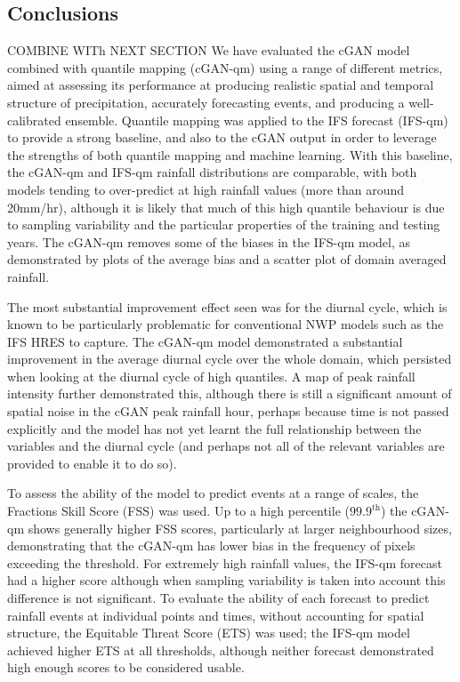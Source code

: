 \documentclass{article}
\begin{document}

\subsection{Conclusions}

COMBINE WITh NEXT SECTION
We have evaluated the cGAN model combined with quantile mapping (cGAN-qm) using a range of different metrics, aimed at assessing its performance at producing realistic spatial and temporal structure of precipitation, accurately forecasting events, and producing a well-calibrated ensemble. 
Quantile mapping was applied to the IFS forecast (IFS-qm) to provide a strong baseline, and also to the cGAN output in order to leverage the strengths of both quantile mapping and machine learning. With this baseline, the cGAN-qm and IFS-qm rainfall distributions are comparable, with both models tending to over-predict at high rainfall values (more than around 20mm/hr), although it is likely that much of this high quantile behaviour is due to sampling variability and the particular properties of the training and testing years. The cGAN-qm removes some of the biases in the IFS-qm model, as demonstrated by plots of the average bias and a scatter plot of domain averaged rainfall.

The most substantial improvement effect seen was for the diurnal cycle, which is known to be particularly problematic for conventional NWP models such as the IFS HRES to capture. The cGAN-qm model demonstrated a substantial improvement in the average diurnal cycle over the whole domain, which persisted when looking at the diurnal cycle of high quantiles. A map of peak rainfall intensity further demonstrated this, although there is still a significant amount of spatial noise in the cGAN peak rainfall hour, perhaps because time is not passed explicitly and the model has not yet learnt the full relationship between the variables and the diurnal cycle (and perhaps not all of the relevant variables are provided to enable it to do so).

To assess the ability of the model to predict events at a range of scales, the Fractions Skill Score (FSS) was used. Up to a high percentile ($99.9^{\text{th}}$) the cGAN-qm shows generally higher FSS scores, particularly at larger neighbourhood sizes, demonstrating that the cGAN-qm has lower bias in the frequency of pixels exceeding the threshold. For extremely high rainfall values, the IFS-qm forecast had a higher score although when sampling variability is taken into account this difference is not significant. To evaluate the ability of each forecast to predict rainfall events at individual points and times, without accounting for spatial structure, the Equitable Threat Score (ETS) was used; the IFS-qm model achieved higher ETS at all thresholds, although neither forecast demonstrated high enough scores to be considered usable.
\end{document}
